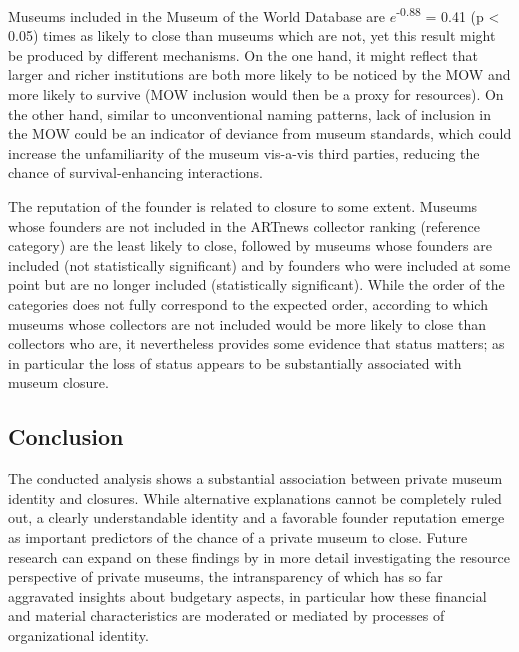 \documentclass[12pt]{article}
\begin{document}
Museums included in the Museum of the World Database are \(e\)\textsuperscript{-0.88} = 0.41 (p < 0.05) times as likely to close than museums which are not, yet this result might be produced by different mechanisms.
On the one hand, it might reflect that larger and richer institutions are both more likely to be noticed by the MOW and more likely to survive (MOW inclusion would then be a proxy for resources).
On the other hand, similar to unconventional naming patterns, lack of inclusion in the MOW could be an indicator of deviance from museum standards, which could increase the unfamiliarity of the museum vis-a-vis third parties, reducing the chance of survival-enhancing interactions.




The reputation of the founder is related to closure to some extent. 
Museums whose founders are not included in the ARTnews collector ranking (reference category) are the least likely to close, followed by museums whose founders are included (not statistically significant) and by founders who were included at some point but are no longer included (statistically significant).
While the order of the categories does not fully correspond to the expected order, according to which museums whose collectors are not included would be more likely to close than collectors who are, it nevertheless provides some evidence that status matters; as in particular the loss of status appears to be substantially associated with museum closure.

\subsection*{Conclusion}

The conducted analysis shows a substantial association between private museum identity and closures.
While alternative explanations cannot be completely ruled out, a clearly understandable identity and a favorable founder reputation emerge as important predictors of the chance of a private museum to close.
Future research can expand on these findings by in more detail investigating the resource perspective of private museums, the intransparency of which has so far aggravated insights about budgetary aspects, in particular how these financial and material characteristics are moderated or mediated by processes of organizational identity.




\begin{sloppypar}
\printbibliography
\end{sloppypar}
\end{document}
